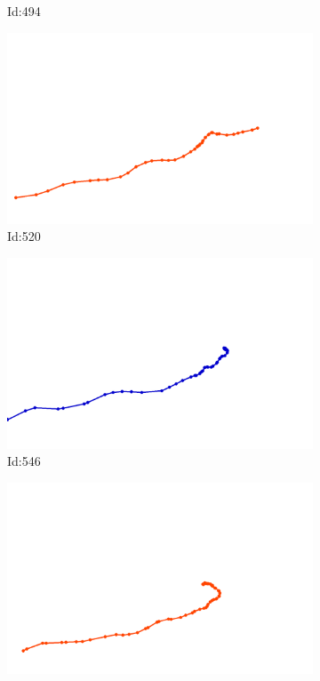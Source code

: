 \documentclass[12pt,twoside]{report}
\begin{document}
\begin{figure}
\begin{subfigure}[b]{0.20\textwidth}
\caption{Id:494}
\end{subfigure}
\begin{subfigure}[b]{0.20\textwidth}
\centering
\includegraphics[width=\textwidth]{../trajectories/520.png}
\caption{Id:520}
\end{subfigure}
\begin{subfigure}[b]{0.20\textwidth}
\centering
\includegraphics[width=\textwidth]{../trajectories/546.png}
\caption{Id:546}
\end{subfigure}
\begin{subfigure}[b]{0.20\textwidth}
\centering
\includegraphics[width=\textwidth]{../trajectories/590.png}

\end{subfigure}
\end{figure}
\end{document}

